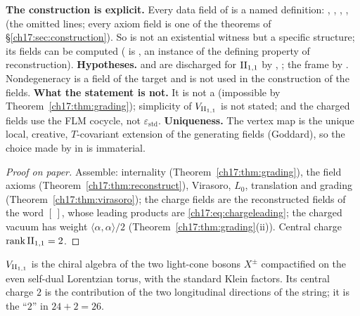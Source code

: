 \begin{dictionary}
\textbf{The construction is explicit.}  Every data field of  is a named
definition: , , ,
,  (the omitted lines;
every axiom field is one of the theorems of \S\ref{ch17:sec:construction}).  So
 is not an existential witness but a specific structure; its fields can be computed
( is , an instance of the defining
property of reconstruction).  \textbf{Hypotheses.}  and  are discharged for
${\mathrm{II}_{1,1}}$ by , ; the frame by
.  Nondegeneracy is a field of the target and is not used in the construction of
the fields.  \textbf{What the statement is not.} It is not a  (impossible by
Theorem~\ref{ch17:thm:grading}); simplicity of ${V_{\mathrm{II}_{1,1}}}$ is not stated; and the charged fields use the FLM
cocycle, not $\varepsilon_{\mathrm{std}}$.  \textbf{Uniqueness.} The vertex map is the unique local, creative,
$T$-covariant extension of the generating fields (Goddard), so the choice made by  in
 is immaterial.
\end{dictionary}

\begin{proof}[Proof on paper]
Assemble: internality (Theorem~\ref{ch17:thm:grading}), the field axioms (Theorem~\ref{ch17:thm:reconstruct}),
Virasoro, $L_0$, translation and grading (Theorem~\ref{ch17:thm:virasoro}); the charge fields are the
reconstructed fields of the word $[\,]$, whose leading products are \eqref{ch17:eq:chargeleading}; the
charged vacuum has weight $\langle\alpha,\alpha\rangle/2$ (Theorem~\ref{ch17:thm:grading}(ii)).  Central charge $\operatorname{rank}{\mathrm{II}_{1,1}}=2$.
\end{proof}

\begin{physics}
${V_{\mathrm{II}_{1,1}}}$ is the chiral algebra of the two light-cone bosons $X^\pm$ compactified on the even
self-dual Lorentzian torus, with the standard Klein factors.  Its central charge $2$ is the contribution of
the two longitudinal directions of the string; it is the ``$2$'' in $24+2=26$.
\end{physics}

